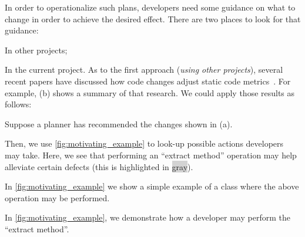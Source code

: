 In order to operationalize such plans, developers need some guidance on what to change in order to achieve the desired effect. 
There are two places to look
for that guidance:
\be
\item In other projects;
\item In the current project.
\ee
As to  the first approach
({\em using other projects}), 
 several recent papers have discussed how code changes adjust
static code metrics~\citep{stroggylos2007, du2006study, kataoka2002, bryton2009, elish2011, elish2012}.
For example,
(b) shows a summary of
that research. 
We could apply those results
as follows:\bi
\item
Suppose a planner has recommended the changes shown in (a). 
\item
Then, we use \ref{fig:motivating_example}\protect{} to look-up possible actions developers may take.
Here, we see that performing an ``extract method'' operation may help alleviate certain defects (this is highlighted in {\colorbox{lightgray}{gray}}).
\item
In \ref{fig:motivating_example}\protect{} we show a simple example of a class where the above operation may be performed. 
\item
In \ref{fig:motivating_example}\protect{}, we demonstrate how a developer may perform the ``extract method''. 
\ei
